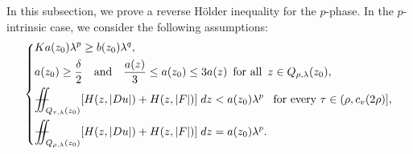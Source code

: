 \documentclass[11pt,oneside, english,reqno,twoside a4paper]{amsart}
\theoremstyle{definition}
\numberwithin{theorem}{section}
\numberwithin{equation}{section}
\newcommand{\la}{\lambda}
\newcommand{\iintss}{{\int\hspace{-0.28cm}\int}}
\newcommand{ \miints }{{\iintss\hspace{-0.56cm} -\hspace{-0.15cm}-}}
\newcommand{\miint}[1]{{\miints_{\hspace{-0.13cm}#1}}}
\begin{document}
In this subsection, we prove a reverse H\"{o}lder inequality for the $p$-phase. In the $p$-intrinsic case, we consider the following assumptions:
\begin{equation}    \label{eq: p-phase condition}
    \left\{
    \begin{aligned}
        &Ka(z_0)\lambda^p \geq b(z_0)\lambda^q,\\
        & a(z_0)\geq \frac{\delta}{2} \quad \text{and}\quad \frac{a(z)}{3}\leq a(z_0)\leq 3a(z) \ \, \text{for all}\,\,\, z\in Q_{\rho, \la}(z_0),\\
        &\miint{Q_{\tau,\lambda}(z_0)} [H(z,|Du|)+H(z,|F|)] \; dz <a(z_0)\lambda^p \ \, \text{ for every }\tau\in(\rho,c_v(2\rho)],\\
        &\miint{Q_{\rho,\lambda}(z_0)} [H(z,|Du|)+H(z,|F|)] \; dz =a(z_0)\lambda^p.
    \end{aligned}
    \right.
\end{equation}
\end{document}
